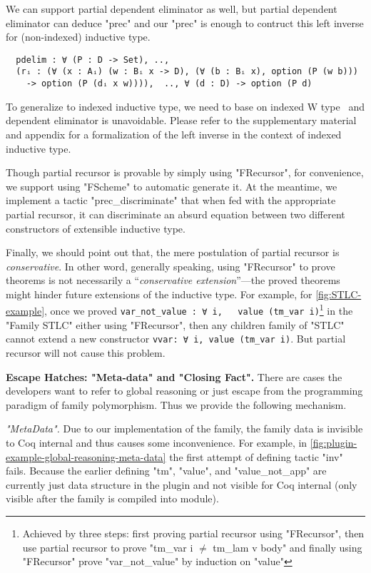 We can support partial dependent eliminator as well, but partial dependent eliminator can deduce "prec" and our "prec" is enough to contruct this left inverse for (non-indexed) inductive type. 
\begin{verbatim}
  pdelim : ∀ (P : D -> Set), .., 
  (rᵢ : (∀ (x : Aᵢ) (w : Bᵢ x -> D), (∀ (b : Bᵢ x), option (P (w b))) 
    -> option (P (dᵢ x w)))),  .., ∀ (d : D) -> option (P d)
\end{verbatim}
To generalize to indexed inductive type, we need to base on indexed W type~\cite{martin1982constructive, morris2009indexed,jashug2017} and dependent eliminator is unavoidable. Please refer to the supplementary material and appendix for a formalization of the left inverse in the context of indexed inductive type. 

Though partial recursor is provable by simply using "FRecursor", for convenience, we support using "FScheme" to automatic generate it. At the meantime, we implement a tactic "prec_discriminate" that when fed with the appropriate partial recursor, it can discriminate an absurd equation between two different constructors of extensible inductive type.

Finally, we should point out that, the mere postulation of partial recursor is \textit{conservative}. In other word, generally speaking, using "FRecursor" to prove theorems is not necessarily a ``\textit{conservative extension}''---the proved theorems might hinder future extensions of the inductive type. For example, for \cref{fig:STLC-example}, once we proved \texttt{var_not_value : ∀ i, ~ value (tm_var i)}\footnote{Achieved by three steps: first proving partial recursor using "FRecursor", then use partial recursor to prove "tm_var i $\neq$ tm_lam v body" and finally using "FRecursor" prove "var_not_value" by induction on "value"} in the "Family STLC" either using "FRecursor", then any children family of "STLC" cannot extend a new constructor \texttt{vvar: ∀ i, value (tm_var i)}. But partial recursor will not cause this problem.


\textbf{Escape Hatches: "Meta-data" and "Closing Fact".} There are cases the developers want to refer to global reasoning or just escape from the programming paradigm of family polymorphism. Thus we provide the following mechanism.

\textit{"MetaData".} Due to our implementation of the family,
the family data is invisible to Coq internal and thus causes some
inconvenience. For example, in
\cref{fig:plugin-example-global-reasoning-meta-data} the first attempt
of defining tactic "inv" fails. Because the earlier defining "tm",
"value", and "value_not_app" are currently just data structure in the
plugin and not visible for Coq internal (only visible after the family
is compiled into module). 

